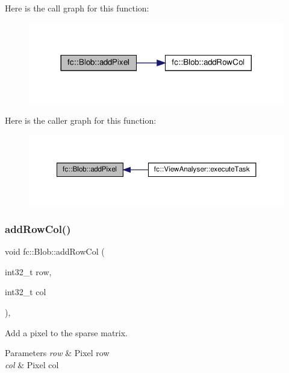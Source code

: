 Here is the call graph for this function\+:
\nopagebreak
\begin{figure}[H]
\begin{center}
\leavevmode
\includegraphics[width=317pt]{d2/d7e/classfc_1_1Blob_a01be7313665ad198c73220165a008f2b_cgraph}
\end{center}
\end{figure}
Here is the caller graph for this function\+:
\nopagebreak
\begin{figure}[H]
\begin{center}
\leavevmode
\includegraphics[width=350pt]{d2/d7e/classfc_1_1Blob_a01be7313665ad198c73220165a008f2b_icgraph}
\end{center}
\end{figure}
\mbox{\label{classfc_1_1Blob_a4c9d015ad9326b4f5688af7ae190e613}} 
\subsubsection{\texorpdfstring{add\+Row\+Col()}{addRowCol()}}
{\footnotesize\ttfamily void fc\+::\+Blob\+::add\+Row\+Col (\begin{DoxyParamCaption}\item[{int32\+\_\+t}]{row,  }\item[{int32\+\_\+t}]{col }\end{DoxyParamCaption})\hspace{0.3cm}{\ttfamily [inline]}, {\ttfamily [private]}}



Add a pixel to the sparse matrix. 


\begin{DoxyParams}{Parameters}
{\em row} & Pixel row \\
\hline
{\em col} & Pixel col \\
\hline
\end{DoxyParams}


